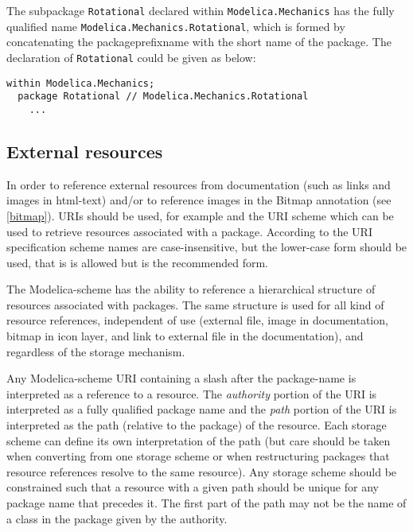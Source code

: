 \begin{example}
The subpackage \lstinline!Rotational! declared within
\lstinline!Modelica.Mechanics! has the fully qualified name
\lstinline!Modelica.Mechanics.Rotational!, which is formed by concatenating
the packageprefixname with the short name of the package. The
declaration of \lstinline!Rotational! could be given as below:
\begin{lstlisting}[language=modelica]
  within Modelica.Mechanics;
  package Rotational // Modelica.Mechanics.Rotational
    ...
\end{lstlisting}
\end{example}

\subsection{External resources}

In order to reference external resources from documentation (such as
links and images in html-text) and/or to reference images in the Bitmap
annotation (see \autoref{bitmap}). URIs should be used, for example
 and the URI scheme  which can be used to retrieve
resources associated with a package. According to the URI specification scheme names are
case-insensitive, but the lower-case form should be used, that is  is allowed but  is the
recommended form.

The Modelica-scheme has the ability to reference a hierarchical
structure of resources associated with packages. The same structure is
used for all kind of resource references, independent of use (external
file, image in documentation, bitmap in icon layer, and link to external
file in the documentation), and regardless of the storage mechanism.

Any Modelica-scheme URI containing a slash after the package-name is
interpreted as a reference to a resource. The \emph{authority} portion of the
URI is interpreted as a fully qualified package name and the \emph{path}
portion of the URI is interpreted as the path (relative to the package)
of the resource. Each storage scheme can define its own interpretation
of the path (but care should be taken when converting from one storage
scheme or when restructuring packages that resource references resolve
to the same resource). Any storage scheme should be constrained such
that a resource with a given path should be unique for any package name
that precedes it. The first part of the path may not be the name of a
class in the package given by the authority.

